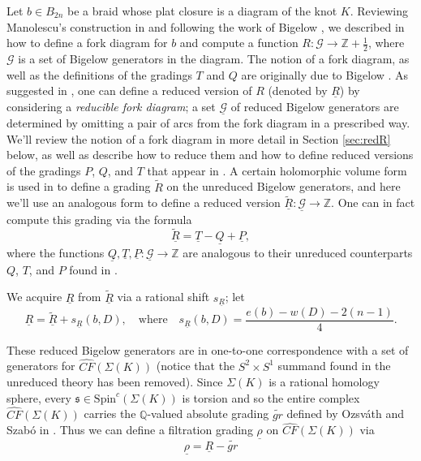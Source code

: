 \documentclass[11pt]{article}
\theoremstyle{plain} \newtheorem{thm}{Theorem}[subsection]
\theoremstyle{plain} \newtheorem{cor}[thm]{Corollary}
\theoremstyle{plain} \newtheorem{prop}[thm]{Proposition}
\theoremstyle{plain} \newtheorem{conj}[thm]{Conjecture}
\theoremstyle{plain} \newtheorem{lem}[thm]{Lemma}
\theoremstyle{definition} \newtheorem{df}[thm]{Definition}
\theoremstyle{remark} \newtheorem{rmk}[thm]{Remark}
\theoremstyle{remark} \newtheorem{obs}[thm]{Observation}
\newcommand{\B}[1]{B_{#1} }
\newcommand{\SxS}{S^{2}\times S^{1}}
\newcommand{\DBC}[1]{\Sigma(#1)}
\newcommand{\G}{\mathcal{G}}
\newcommand{\tld}[1]{\widetilde{#1}}
\newcommand{\red}[1]{\underline{#1}}
\newcommand{\OS}{Ozsv\'ath and Szab\'o }
\numberwithin{equation}{section}
\begin{document}
Let $b \in \B{2n}$ be a braid whose plat closure is a diagram of the knot $K$.  Reviewing Manolescu's construction in \cite{cm:R} and following the work of Bigelow \cite{big:jones}, we described in \cite{et:R} how to define a fork diagram for $b$ and compute a function $R: \G \rightarrow \mathbb{Z}+\frac{1}{2}$, where $\G$ is a set of Bigelow generators in the diagram.  The notion of a fork diagram, as well as the definitions of the gradings $T$ and $Q$ are originally due to Bigelow \cite{big:jones}.  As suggested in \cite{cm:R}, one can define a reduced version of $R$ (denoted by $\red{R}$) by considering a \textit{reducible fork diagram};  a set $\red{\G}$ of reduced Bigelow generators are determined by omitting a pair of arcs from the fork diagram in a prescribed way.  We'll review the notion of a fork diagram in more detail in Section \ref{sec:redR} below, as well as describe how to reduce them and how to define reduced versions of the gradings $P$, $Q$, and $T$ that appear in \cite{cm:R}.  A certain holomorphic volume form is used in \cite{et:R} to define a grading $\tld{R}$ on the unreduced Bigelow generators, and here we'll use an analogous form to define a reduced version $\red{\tld{R}}:\red{\G} \rightarrow \mathbb{Z}$.  One can in fact compute this grading via the formula
\begin{equation*}
\red{\tld{R}} = \red{T} - \red{Q} + \red{ P},
\end{equation*}
where the functions $\red{Q},\red{T}, \red{ P}:\red{\G} \rightarrow \mathbb{Z}$ are analogous to their unreduced counterparts $Q$, $T$, and $P$ found in \cite{et:R}.

We acquire $\red{R}$ from $\red{\tld{R}}$ via a rational shift $s_{\red{R}}$; let
\begin{equation*}
\red{R} = \red{\tld{R}} + s_{\red{R}}(b,D),\quad \text{where} \quad s_{\red{R}}(b,D) = \frac{e(b) - w(D) -2(n-1)}{4}.
\end{equation*}

These reduced Bigelow generators are in one-to-one correspondence with a set of generators for $\widehat{CF}(\DBC{K})$ (notice that the $\SxS$ summand found in the unreduced theory has been removed).  Since $\DBC{K}$ is a rational homology sphere, every $\mathfrak{s} \in \text{Spin}^{c}(\DBC{K})$ is torsion and so the entire complex $\widehat{CF}(\DBC{K})$ carries the $\mathbb{Q}$-valued absolute grading $\tld{gr}$ defined by \OS in \cite{os:tri}.  Thus we can define a filtration grading $\red{\rho}$ on $\widehat{CF}(\DBC{K})$ via
\begin{equation*}
\red{\rho} = \red{R} - \tld{gr}
\end{equation*}
\end{document}
